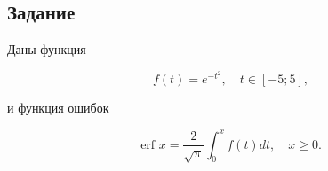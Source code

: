 \subsection*{Задание}\label{blockN.VariantM}

Даны функция

\begin{equation}
    f(t) = e^{-t^2},\quad t \in [-5;5],
\label{eq:1}
\end{equation}

и функция ошибок

\begin{equation}
    \text{erf }x = \frac{2}{\sqrt{\pi}}\int_{0}^x f(t)dt, \quad x \ge 0.
\end{equation}

